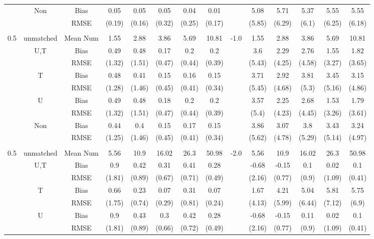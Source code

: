 \begin{tabular}{@{\extracolsep{5pt}}lc|cccccc|lccccc}
 & Non & Bias & 0.05 & 0.05 & 0.05 & 0.04 & 0.01 &  & 5.08 & 5.71 & 5.37 & 5.55 & 5.55 \\
 &  & RMSE & (0.19) & (0.16) & (0.32) & (0.25) & (0.17) &  & (5.85) & (6.29) & (6.1) & (6.25) & (6.18) \\
 &  &  &  &  &  &  &  &  &  &  &  &  &  \\
0.5 & unmatched & Mean Num & 1.55 & 2.88 & 3.86 & 5.69 & 10.81 & -1.0 & 1.55 & 2.88 & 3.86 & 5.69 & 10.81 \\
 & U,T & Bias & 0.49 & 0.48 & 0.17 & 0.2 & 0.2 &  & 3.6 & 2.29 & 2.76 & 1.55 & 1.82 \\
 &  & RMSE & (1.32) & (1.51) & (0.47) & (0.44) & (0.39) &  & (5.43) & (4.25) & (4.58) & (3.27) & (3.65) \\
 & T & Bias & 0.48 & 0.41 & 0.15 & 0.16 & 0.15 &  & 3.71 & 2.92 & 3.81 & 3.45 & 3.15 \\
 &  & RMSE & (1.28) & (1.46) & (0.45) & (0.41) & (0.34) &  & (5.45) & (4.68) & (5.3) & (5.16) & (4.86) \\
 & U & Bias & 0.49 & 0.48 & 0.18 & 0.2 & 0.2 &  & 3.57 & 2.25 & 2.68 & 1.53 & 1.79 \\
 &  & RMSE & (1.32) & (1.51) & (0.47) & (0.44) & (0.39) &  & (5.4) & (4.23) & (4.45) & (3.26) & (3.61) \\
 & Non & Bias & 0.44 & 0.4 & 0.15 & 0.17 & 0.15 &  & 3.86 & 3.07 & 3.8 & 3.43 & 3.24 \\
 &  & RMSE & (1.25) & (1.46) & (0.45) & (0.41) & (0.34) &  & (5.62) & (4.78) & (5.29) & (5.14) & (4.97) \\
 &  &  &  &  &  &  &  &  &  &  &  &  &  \\
0.5 & unmatched & Mean Num & 5.56 & 10.9 & 16.02 & 26.3 & 50.98 & -2.0 & 5.56 & 10.9 & 16.02 & 26.3 & 50.98 \\
 & U,T & Bias & 0.9 & 0.42 & 0.31 & 0.41 & 0.28 &  & -0.68 & -0.15 & 0.1 & 0.02 & 0.1 \\
 &  & RMSE & (1.81) & (0.89) & (0.67) & (0.71) & (0.49) &  & (2.16) & (0.77) & (0.9) & (1.09) & (0.41) \\
 & T & Bias & 0.66 & 0.23 & 0.07 & 0.31 & 0.07 &  & 1.67 & 4.21 & 5.04 & 5.81 & 5.75 \\
 &  & RMSE & (1.75) & (0.74) & (0.29) & (0.81) & (0.24) &  & (4.13) & (5.99) & (6.44) & (7.12) & (6.9) \\
 & U & Bias & 0.9 & 0.43 & 0.3 & 0.42 & 0.28 &  & -0.68 & -0.15 & 0.11 & 0.02 & 0.1 \\
 &  & RMSE & (1.81) & (0.89) & (0.66) & (0.72) & (0.49) &  & (2.16) & (0.77) & (0.9) & (1.09) & (0.41) \\

\end{tabular}
